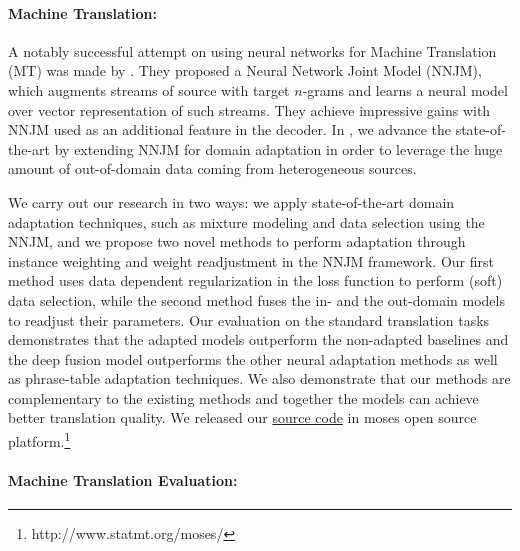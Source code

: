\documentclass{article} %
\begin{document}
\paragraph{Machine Translation:} A notably successful attempt on using neural networks for Machine Translation (MT) was made by \cite{Devlin_2014_acl}. They proposed a Neural Network Joint Model (NNJM), which augments streams of source with target $n$-grams and learns a neural model over vector representation of such streams. They achieve impressive gains with NNJM used as an additional feature in the decoder. In \cite{Shafiq_da_CL16,joty-EtAl:2015:EMNLP2}, we advance the state-of-the-art by extending NNJM for domain adaptation in order to leverage the huge amount of out-of-domain data coming from  heterogeneous sources. 

We carry out our research in two ways: \Ni we apply state-of-the-art domain adaptation techniques, such as mixture modeling and data selection using the NNJM, and \Nii we propose two novel methods to perform adaptation through instance weighting and weight readjustment in the NNJM framework. Our first method uses data dependent regularization in the loss function to perform (soft) data selection, while the second method fuses the in- and the out-domain models to readjust their parameters. Our evaluation on the standard translation tasks demonstrates that the adapted models outperform the non-adapted baselines and the deep fusion model outperforms the other neural adaptation methods as well as phrase-table adaptation techniques. We also demonstrate that our methods are complementary to the existing methods and together the models can achieve better translation quality. We released our \href{http://www.statmt.org/moses/} {source code} in moses open source platform.\footnote{http://www.statmt.org/moses/} %




\paragraph{Machine Translation Evaluation:} 
\end{document}
